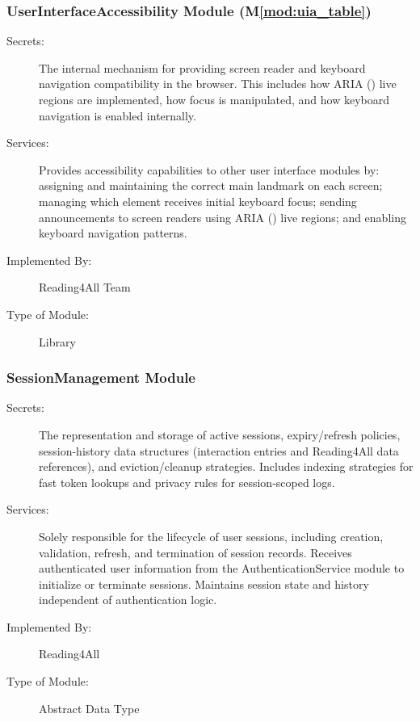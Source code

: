 \documentclass[12pt, titlepage]{article}
\newcommand{\mref}[1]{M\ref{#1}}
\begin{document}
\subsubsection{UserInterfaceAccessibility Module (\mref{mod:uia_table})}
\label{mod:uia}
\begin{description}
  \item[Secrets:] The internal mechanism for providing screen reader
    and keyboard navigation compatibility in the browser.
    This includes how ARIA (\citet{ARIA}) live regions are
    implemented, how focus is manipulated, and how keyboard
    navigation is enabled
    internally.
  \item[Services:] Provides accessibility capabilities to other user
    interface modules by: assigning and maintaining
    the correct main landmark on each screen; managing which element
    receives initial keyboard focus; sending
    announcements to screen readers using ARIA (\citet{ARIA}) live
    regions; and enabling keyboard navigation patterns.
  \item[Implemented By:] Reading4All Team
  \item[Type of Module:] Library
\end{description}
\subsubsection{SessionManagement Module}
\label{mod:mess}
\begin{description}
  \item[Secrets:] The representation and storage of active sessions,
    expiry/refresh policies, session-history data structures
    (interaction entries and Reading4All data references), and
    eviction/cleanup strategies. Includes indexing strategies for
    fast token lookups and privacy rules for session-scoped logs.
  \item[Services:] Solely responsible for the lifecycle of user sessions, 
  including creation, validation, refresh, and termination of session records. 
  Receives authenticated user information from the AuthenticationService module 
  to initialize or terminate sessions. Maintains session state and history 
  independent of authentication logic.
  \item[Implemented By:] Reading4All
  \item[Type of Module:] Abstract Data Type
\end{description}
\end{document}
